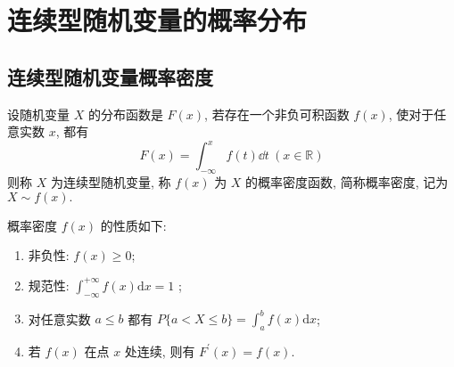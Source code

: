 \section{连续型随机变量的概率分布}

\subsection{连续型随机变量概率密度}

\begin{definition}[连续型随机变量概率密度]
    设随机变量 $ X $ 的分布函数是 $ F(x) $, 若存在一个非负可积函数 $ f(x) $, 使对于任意实数 $ x $, 都有
    $$F(x)=\int_{-\infty}^{x} f(t) \dd t ~(x \in \mathbb{R})$$
    则称 $ X $ 为连续型随机变量, 称 $ f(x) $ 为 $ X $ 的概率密度函数, 简称概率密度, 记为 $ X \sim f(x) .$
\end{definition}

\begin{theorem}[连续型随机变量概率密度的性质]
    概率密度 $ f(x) $ 的性质如下:
    \begin{enumerate}[label=(\arabic{*})]
        \item 非负性: $ f(x) \geqslant 0 $;
        \item 规范性: $ \displaystyle\int_{-\infty}^{+\infty} f(x) \mathrm{d} x=1$ ;
        \item 对任意实数 $ a \leqslant b$ 都有 $\displaystyle P\{a<X \leqslant b\}=\int_{a}^{b} f(x) \mathrm{d} x $;
        \item 若 $ f(x) $ 在点 $ x $ 处连续, 则有 $ F^{\prime}(x)=f(x) .$
    \end{enumerate}
\end{theorem}


